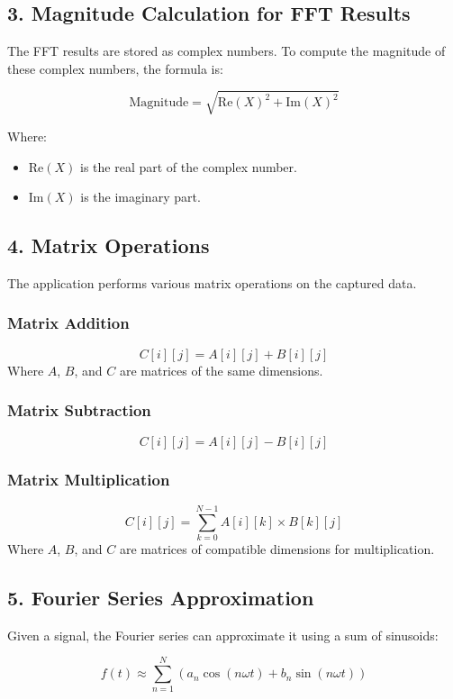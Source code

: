 \documentclass{article}
\begin{document}
\subsection{3. Magnitude Calculation for FFT Results}

The FFT results are stored as complex numbers. To compute the magnitude of these complex numbers, the formula is:

\[
\text{Magnitude} = \sqrt{\text{Re}(X)^2 + \text{Im}(X)^2}
\]

Where:
\begin{itemize}
    \item $\text{Re}(X)$ is the real part of the complex number.
    \item $\text{Im}(X)$ is the imaginary part.
\end{itemize}

\subsection{4. Matrix Operations}

The application performs various matrix operations on the captured data.

\subsubsection{Matrix Addition}
\[
C[i][j] = A[i][j] + B[i][j]
\]
Where $A$, $B$, and $C$ are matrices of the same dimensions.

\subsubsection{Matrix Subtraction}
\[
C[i][j] = A[i][j] - B[i][j]
\]

\subsubsection{Matrix Multiplication}
\[
C[i][j] = \sum_{k=0}^{N-1} A[i][k] \times B[k][j]
\]
Where $A$, $B$, and $C$ are matrices of compatible dimensions for multiplication.

\subsection{5. Fourier Series Approximation}

Given a signal, the Fourier series can approximate it using a sum of sinusoids:

\[
f(t) \approx \sum_{n=1}^{N} \left( a_n \cos(n \omega t) + b_n \sin(n \omega t) \right)
\]
\end{document}

